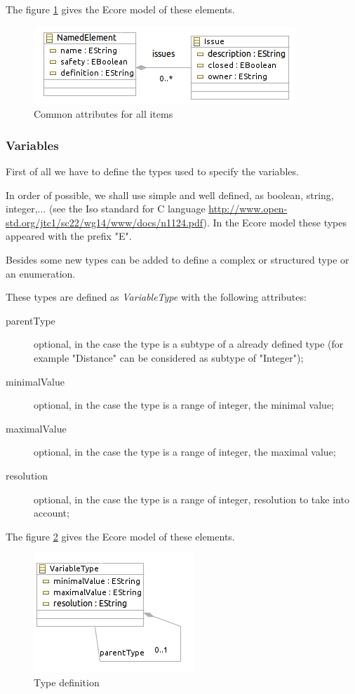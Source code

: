 The figure \ref{fig:Common} gives the Ecore model of these elements.

\begin{figure}[ht]
  \centering
  \includegraphics{DataModel/Common2.png}
  \caption{Common attributes for all items}
  \label{fig:Common}
\end{figure}


\subsubsection{Variables}
\label{sec:var}


First of all we have to define the types used to specify the variables.

In order of possible, we shall use simple and well defined, as boolean, string, integer,... (see the Iso standard for C language \url{http://www.open-std.org/jtc1/sc22/wg14/www/docs/n1124.pdf}). In the Ecore model these types appeared with the prefix "E".

Besides some new types can be added to define a complex or structured type or an enumeration.

These types are defined as \textit{VariableType} with the following attributes:
\begin{description}
\item[parentType] optional, in the case the type is a subtype of a  already defined type (for example "Distance" can be considered as subtype of "Integer");
\item[minimalValue] optional, in the case the type is a range of integer, the minimal value;
\item[maximalValue] optional, in the case the type is a range of integer, the maximal value;
\item[resolution] optional, in the case the type is a range of integer, resolution to take into account;
\end{description}

The figure \ref{fig:Type} gives the Ecore model of these elements.

\begin{figure}[ht]
  \centering
  \includegraphics{DataModel/Type3.png}
  \caption{Type definition}
  \label{fig:Type}
\end{figure}

